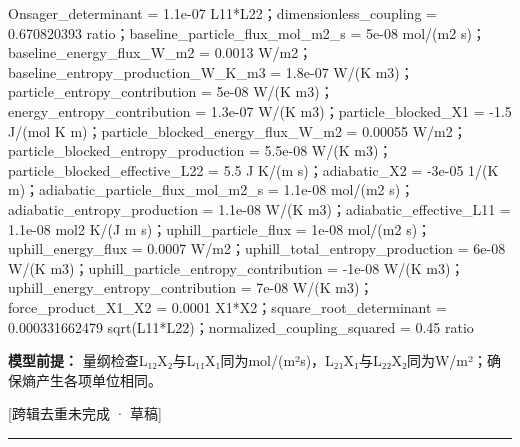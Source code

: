 \documentclass[UTF8,11pt,a4paper]{ctexart}
\begin{document}
Onsager\_determinant = 1.1e-07 L11*L22；dimensionless\_coupling = 0.670820393 ratio；baseline\_particle\_flux\_mol\_m2\_s = 5e-08 mol/(m2 s)；baseline\_energy\_flux\_W\_m2 = 0.0013 W/m2；baseline\_entropy\_production\_W\_K\_m3 = 1.8e-07 W/(K m3)；particle\_entropy\_contribution = 5e-08 W/(K m3)；energy\_entropy\_contribution = 1.3e-07 W/(K m3)；particle\_blocked\_X1 = -1.5 J/(mol K m)；particle\_blocked\_energy\_flux\_W\_m2 = 0.00055 W/m2；particle\_blocked\_entropy\_production = 5.5e-08 W/(K m3)；particle\_blocked\_effective\_L22 = 5.5 J K/(m s)；adiabatic\_X2 = -3e-05 1/(K m)；adiabatic\_particle\_flux\_mol\_m2\_s = 1.1e-08 mol/(m2 s)；adiabatic\_entropy\_production = 1.1e-08 W/(K m3)；adiabatic\_effective\_L11 = 1.1e-08 mol2 K/(J m s)；uphill\_particle\_flux = 1e-08 mol/(m2 s)；uphill\_energy\_flux = 0.0007 W/m2；uphill\_total\_entropy\_production = 6e-08 W/(K m3)；uphill\_particle\_entropy\_contribution = -1e-08 W/(K m3)；uphill\_energy\_entropy\_contribution = 7e-08 W/(K m3)；force\_product\_X1\_X2 = 0.0001 X1*X2；square\_root\_determinant = 0.000331662479 sqrt(L11*L22)；normalized\_coupling\_squared = 0.45 ratio\par
\noindent\textbf{模型前提：}
量纲检查L₁₂X₂与L₁₁X₁同为mol/(m²s)，L₂₁X₁与L₂₂X₂同为W/m²；确保熵产生各项单位相同。\par
\noindent\textcolor{red!65!black}{[跨辑去重未完成 · 草稿]} \par
\medskip\hrule\medskip
{}
\end{document}
